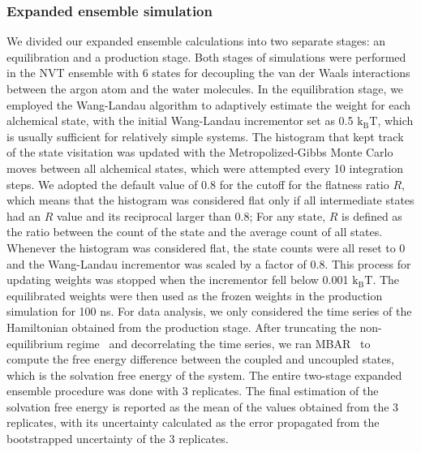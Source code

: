 \documentclass[journal=jacsat,manuscript=article]{achemso}
\begin{document}
\subsubsection{Expanded ensemble simulation}
We divided our expanded ensemble calculations into two separate stages: an equilibration and a production stage. Both stages of simulations were performed in the NVT ensemble with 6 states for decoupling the van der Waals interactions between the argon atom and the water molecules. In the equilibration stage, we employed the Wang-Landau algorithm to adaptively estimate the weight for each alchemical state, with the initial Wang-Landau incrementor set as 0.5 $\text{k}_{\text{B}}\text{T}$, which is usually sufficient for relatively simple systems. The histogram that kept track of the state visitation was updated with the Metropolized-Gibbs Monte Carlo moves between all alchemical states, which were attempted every 10 integration steps. We adopted the default value of 0.8 for the cutoff for the flatness ratio $R$, which means that the histogram was considered flat only if all intermediate states had an $R$ value and its reciprocal larger than 0.8; For any state, $R$ is defined as the ratio between the count of the state and the average count of all states. Whenever the histogram was considered flat, the state counts were all reset to 0 and the Wang-Landau incrementor was scaled by a factor of 0.8. This process for updating weights was stopped when the incrementor fell below 0.001 $\text{k}_{\text{B}}\text{T}$. The equilibrated weights were then used as the frozen weights in the production simulation for 100 ns. For data analysis, we only considered the time series of the Hamiltonian obtained from the production stage. After truncating the non-equilibrium regime~\cite{chodera2016simple} and decorrelating the time series, we ran MBAR~\cite{shirts2008statistically} to compute the free energy difference between the coupled and uncoupled states, which is the solvation free energy of the system. The entire two-stage expanded ensemble procedure was done with 3 replicates. The final estimation of the solvation free energy is reported as the mean of the values obtained from the 3 replicates, with its uncertainty calculated as the error propagated from the bootstrapped uncertainty of the 3 replicates.
\end{document}
